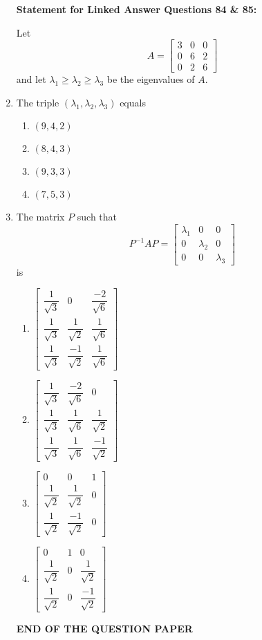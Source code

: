 \documentclass[journal]{IEEEtran}
\newcommand{\myvec}[1]{\begin{bmatrix}#1\end{bmatrix}}
\numberwithin{equation}{enumi}
\numberwithin{figure}{enumi}
\begin{document}
\begin{enumerate}
\bigskip

\textbf{Statement for Linked Answer Questions 84 \& 85:}

Let
\[
A = \myvec{
3 & 0 & 0 \\
0 & 6 & 2 \\
0 & 2 & 6
}
\]
and let $\lambda_1 \geq \lambda_2 \geq \lambda_3$ be the eigenvalues of $A$.

\item The triple $(\lambda_1, \lambda_2, \lambda_3)$ equals    \hfill{}\\
\begin{multicols}{2}
    \begin{enumerate}
        \item $(9, 4, 2)$
        \item $(8, 4, 3)$
        \item $(9, 3, 3)$
        \item $(7, 5, 3)$
    \end{enumerate}
    \end{multicols}



\newpage
\item The matrix $P$ such that   \hfill{}
\[
P^{-1} A P = \begin{bmatrix}
\lambda_1 & 0 & 0 \\
0 & \lambda_2 & 0 \\
0 & 0 & \lambda_3
\end{bmatrix}
\]
is 
\begin{multicols}{2}
    \begin{enumerate}
        \item  $\myvec{
    \dfrac{1}{\sqrt{3}} & 0 & \dfrac{-2}{\sqrt{6}} \\
    \dfrac{1}{\sqrt{3}} & \dfrac{1}{\sqrt{2}} & \dfrac{1}{\sqrt{6}} \\
    \dfrac{1}{\sqrt{3}} & \dfrac{-1}{\sqrt{2}} & \dfrac{1}{\sqrt{6}}
    }$
        \item $\myvec{
    \dfrac{1}{\sqrt{3}} & \dfrac{-2}{\sqrt{6}} & 0 \\
    \dfrac{1}{\sqrt{3}} & \dfrac{1}{\sqrt{6}} & \dfrac{1}{\sqrt{2}} \\
    \dfrac{1}{\sqrt{3}} & \dfrac{1}{\sqrt{6}} & \dfrac{-1}{\sqrt{2}}
    }$
        \item $\myvec{
    0 & 0 & 1 \\
    \dfrac{1}{\sqrt{2}} & \dfrac{1}{\sqrt{2}} & 0 \\
    \dfrac{1}{\sqrt{2}} & \dfrac{-1}{\sqrt{2}} & 0
   }$
        \item $\myvec{
    0 & 1 & 0 \\
    \dfrac{1}{\sqrt{2}} & 0 & \dfrac{1}{\sqrt{2}} \\
    \dfrac{1}{\sqrt{2}} & 0 & \dfrac{-1}{\sqrt{2}}
    }$
    \end{enumerate}
    \end{multicols}




\vspace{5em}
\begin{center}
    \textbf{END OF THE QUESTION PAPER}
\end{center}

\end{enumerate}
\end{document}
